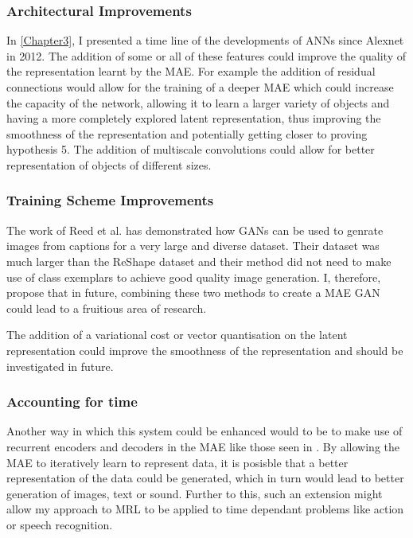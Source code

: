 \subsubsection{Architectural Improvements}
In \autoref{Chapter3}, I presented a time line of the developments of \acp{ANN} since Alexnet \cite{krizhevsky2012imagenet} in 2012. The addition of some or all of these features could improve the quality of the representation learnt by the \ac{MAE}. For example the addition of residual connections \cite{he2016deep} would allow for the training of a deeper \ac{MAE} which could increase the capacity of the network, allowing it to learn a larger variety of objects and having a more completely explored latent representation, thus improving the smoothness of the representation and potentially getting closer to proving hypothesis 5. The addition of multiscale convolutions \cite{szegedy2015going} could allow for better representation of objects of different sizes.

\subsubsection{Training Scheme Improvements}
The work of Reed et al. \cite{reed2016generative} has demonstrated how \acp{GAN} can be used to genrate images from captions for a very large and diverse dataset. Their dataset was much larger than the ReShape dataset and their method did not need to make use of class exemplars to achieve good quality image generation. I, therefore, propose that in future, combining these two methods to create a \ac{MAE} \ac{GAN} could lead to a fruitious area of research.

The addition of a variational cost \cite{kingma2013auto} or vector quantisation \cite{wavenet} on the latent representation could improve the smoothness of the representation and should be investigated in future.


\subsubsection{Accounting for time}
Another way in which this system could be enhanced would to be to make use of recurrent encoders and decoders in the \ac{MAE} like those seen in \cite{gregor2015draw}. By allowing the \ac{MAE} to iteratively learn to represent data, it is posisble that a better representation of the data could be generated, which in turn would lead to better generation of images, text or sound. Further to this, such an extension might allow my approach to \ac{MRL} to be applied to time dependant problems like action or speech recognition.




